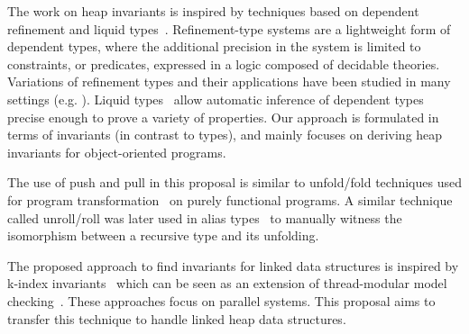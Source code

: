 The work on heap invariants is inspired by techniques based on dependent
refinement and liquid types~\cite{RondonKJ08}.  Refinement-type
  systems are a lightweight form of dependent types, where the
additional precision in the system is limited to constraints, or
predicates, expressed in a logic composed of decidable theories.
Variations of refinement types and their applications have been
studied in many settings
(e.g. \cite{FreemanP91,XiP99,KnowlesF10,BengtsonBFGM08}).
%
Liquid types~\cite{RondonKJ08} allow automatic inference of dependent
types precise enough to prove a variety of properties.  Our approach
is formulated in terms of invariants (in contrast to types), and
mainly focuses on deriving heap invariants for
object-oriented programs.

The use of push and pull in this proposal is similar to  unfold/fold
techniques used for program transformation~\cite{BurstallD77} on purely
functional programs.
A similar technique called unroll/roll was later used in alias
types~\cite{WalkerM00} to manually witness the isomorphism between a recursive
type and its unfolding.

The proposed approach to find invariants for linked data structures is
inspired by k-index invariants~\cite{Sanchez:2012:IGP:2414936.2414950} which can be seen as an extension of thread-modular model
checking~\cite{Flanagan:2003:TMC:1767111.1767125}. These approaches focus
on parallel systems. This proposal aims to transfer this technique to handle
linked heap data structures.

